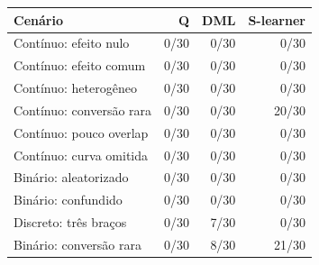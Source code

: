 \begin{tabular}{lrrr}
\toprule
Cenário & Q & DML & S-learner \\
\midrule
Contínuo: efeito nulo & 0/30 & 0/30 & 0/30 \\
Contínuo: efeito comum & 0/30 & 0/30 & 0/30 \\
Contínuo: heterogêneo & 0/30 & 0/30 & 0/30 \\
Contínuo: conversão rara & 0/30 & 0/30 & 20/30 \\
Contínuo: pouco overlap & 0/30 & 0/30 & 0/30 \\
Contínuo: curva omitida & 0/30 & 0/30 & 0/30 \\
Binário: aleatorizado & 0/30 & 0/30 & 0/30 \\
Binário: confundido & 0/30 & 0/30 & 0/30 \\
Discreto: três braços & 0/30 & 7/30 & 0/30 \\
Binário: conversão rara & 0/30 & 8/30 & 21/30 \\
\bottomrule
\end{tabular}
